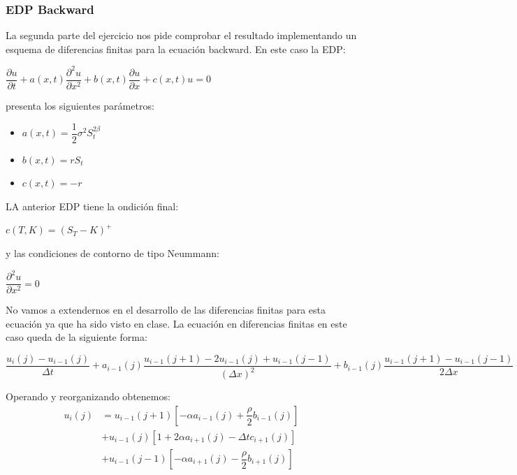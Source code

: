 \documentclass[titlepage, 10pt,]{article}
\begin{document}
\newpage
\subsubsection*{EDP Backward}

La segunda parte del ejercicio nos pide comprobar el resultado implementando un esquema de diferencias finitas para la ecuación backward. En este caso la EDP:

\begin{center}
	$\dfrac{\partial u}{\partial t} + a(x, t) \dfrac{\partial^{2}u}{\partial{x}^{2}} + b(x, t) \dfrac{\partial u}{\partial x} + c(x, t) u = 0$
\end{center}

presenta los siguientes parámetros:

\begin{itemize}
	\item[] $a(x, t) = \dfrac{1}{2} \sigma^{2} S_{t}^{2\beta}$ 
	\item[] $b(x, t) = rS_{t}$
	\item[] $c(x, t) = -r$	
\end{itemize}

\vspace{7pt}
LA anterior EDP tiene la ondición final:
\begin{center}
	$c(T, K) = (S_{T} - K)^{+}$
\end{center}

y las condiciones de contorno de tipo Neummann:

\begin{center}
	$\dfrac{\partial^{2}u}{\partial{x}^{2}} = 0$
\end{center}

No vamos a extendernos en el desarrollo de las diferencias finitas para esta ecuación ya que ha sido visto en clase. La ecuación en diferencias finitas en este caso queda de la siguiente forma:

\begin{center}
	$\dfrac{u_{i}(j) - u_{i-1}(j)}{\Delta t} + a_{i-1}(j) \dfrac{u_{i-1}(j+1) - 2u_{i-1}(j) + u_{i-1}(j-1)}{(\Delta x)^2} + b_{i-1}(j) \dfrac{u_{i-1}(j+1) - u_{i-1}(j-1)}{2 \Delta x} + c_{i-1}(j) u_{i-1}(j) = 0$
\end{center}

Operando y reorganizando obtenemos:
\begin{align*}
	u_{i}(j) &=  u_{i-1}(j+1)[-\alpha a_{i-1}(j) + \dfrac{\rho}{2} b_{i-1}(j)] \\ 
	& + u_{i-1}(j)[1 + 2  \alpha a_{i+1}(j) - \Delta t c_{i+1}(j)] \\
	& + u_{i-1}(j-1) [-\alpha a_{i+1}(j) - \dfrac{\rho}{2} b_{i+1}(j)]
\end{align*}
\end{document}
